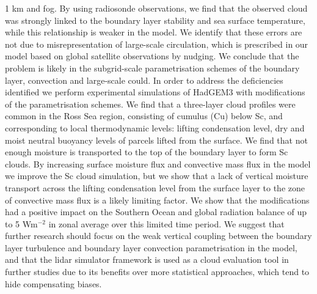 1 km and fog. By using radiosonde observations, we find that the observed cloud was strongly linked to the boundary layer stability and sea surface temperature, while this relationship is weaker in the
model. We identify that these errors are not due to misrepresentation of
large-scale circulation, which is prescribed in our model based on global
satellite observations by nudging. We conclude that the problem is likely in
the subgrid-scale parametrisation schemes of the boundary layer, convection
and large-scale could. In order to address the deficiencies identified we
perform experimental simulations of HadGEM3 with modifications of the
parametrisation schemes. We find that a three-layer cloud profiles were common
in the Ross Sea region, consisting of cumulus (Cu) below Sc, and
corresponding to local thermodynamic levels: lifting condensation level,
dry and moist neutral buoyancy levels of parcels lifted from the surface.
We find that not enough moisture is transported to the top of the boundary
layer to form Sc clouds. By increasing surface moisture flux and convective mass
flux in the model we improve the Sc cloud simulation, but we show that a lack of
vertical moisture transport across the lifting condensation level from the surface layer to the zone of convective mass flux is a likely limiting factor. We show that the modifications had a positive impact on the Southern Ocean and global radiation balance of up to 5 Wm$^{-2}$ in zonal average over this limited time period. We suggest that
further research should focus on the weak vertical coupling between the boundary
layer turbulence and boundary layer convection parametrisation in the model, and that
the lidar simulator framework is used as a cloud evaluation tool in further studies
due to its benefits over more statistical approaches, which tend to hide
compensating biases. 
